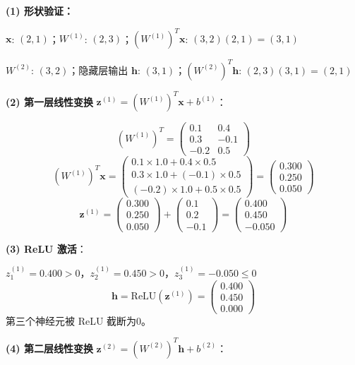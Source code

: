 \documentclass[a4paper,11pt]{ctexart}
\begin{document}
\begin{solutionbox}[参考答案与详细解析]
    \textbf{(1) 形状验证：}

    $\mathbf{x}$: $(2,1)$；$W^{(1)}$: $(2,3)$；$(W^{(1)})^T\mathbf{x}$: $(3,2)(2,1)=(3,1)$

    $W^{(2)}$: $(3,2)$；隐藏层输出 $\mathbf{h}$: $(3,1)$；$(W^{(2)})^T\mathbf{h}$: $(2,3)(3,1)=(2,1)$

    \textbf{(2) 第一层线性变换} $\mathbf{z}^{(1)} = (W^{(1)})^T\mathbf{x} + b^{(1)}$：

    \[
    (W^{(1)})^T = \begin{pmatrix}0.1&0.4\\0.3&-0.1\\-0.2&0.5\end{pmatrix}
    \]
    \[
    (W^{(1)})^T\mathbf{x} = \begin{pmatrix}0.1\times1.0+0.4\times0.5\\0.3\times1.0+(-0.1)\times0.5\\(-0.2)\times1.0+0.5\times0.5\end{pmatrix}
    = \begin{pmatrix}0.300\\0.250\\0.050\end{pmatrix}
    \]
    \[
    \mathbf{z}^{(1)} = \begin{pmatrix}0.300\\0.250\\0.050\end{pmatrix} + \begin{pmatrix}0.1\\0.2\\-0.1\end{pmatrix}
    = \boxed{\begin{pmatrix}0.400\\0.450\\-0.050\end{pmatrix}}
    \]

    \textbf{(3) ReLU 激活}：

    $z^{(1)}_1=0.400>0$，$z^{(1)}_2=0.450>0$，$z^{(1)}_3=-0.050\leq0$
    \[
    \mathbf{h} = \text{ReLU}(\mathbf{z}^{(1)}) = \boxed{\begin{pmatrix}0.400\\0.450\\0.000\end{pmatrix}}
    \]
    第三个神经元被 ReLU 截断为0。

    \textbf{(4) 第二层线性变换} $\mathbf{z}^{(2)} = (W^{(2)})^T\mathbf{h} + b^{(2)}$：


\end{solutionbox}
\end{document}
